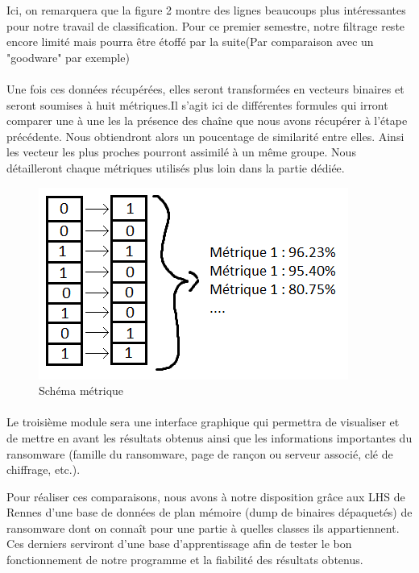 \documentclass[a4paper, 12pt, twoside]{article}
\begin{document}
Ici, on remarquera que la figure 2 montre des lignes beaucoups plus intéressantes pour notre travail de classification. Pour ce premier semestre, notre filtrage reste encore limité mais pourra être étoffé par la suite(Par comparaison avec un "goodware" par exemple)


\paragraph{}

Une fois ces données récupérées, elles seront transformées en vecteurs binaires et seront soumises à huit métriques.Il s'agit ici de différentes formules qui irront comparer une à une les la présence des chaîne que nous avons récupérer à l'étape précédente. Nous obtiendront alors un poucentage de similarité entre elles. Ainsi les vecteur les plus proches pourront assimilé à un même groupe. Nous détailleront chaque métriques utilisés plus loin dans la partie dédiée.

\begin{figure}[h]
  \centering
  \includegraphics[scale=0.70]{Capture3.png}
  \caption{Schéma métrique}
\end{figure}




\paragraph{}
Le troisième module sera une interface graphique qui permettra de visualiser et de mettre en avant les résultats obtenus ainsi que les informations importantes du ransomware (famille du ransomware, page de rançon ou serveur associé, clé de chiffrage, etc.).










Pour réaliser ces comparaisons, nous avons à notre disposition grâce aux LHS de Rennes d'une base de données de plan mémoire (dump de binaires dépaquetés) de ransomware dont on connaît pour une partie à quelles classes ils appartiennent. Ces derniers serviront d'une base d'apprentissage afin de tester le bon fonctionnement de notre programme et la fiabilité des résultats obtenus.
\end{document}
